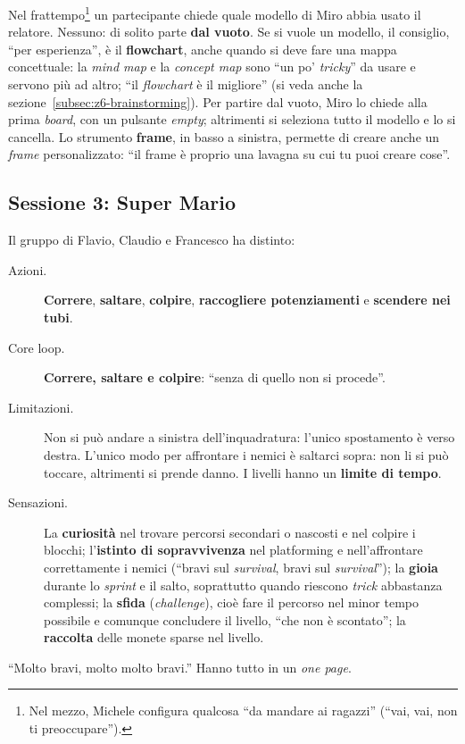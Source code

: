 Nel frattempo\footnote{Nel mezzo, Michele configura qualcosa ``da mandare ai
ragazzi'' (``vai, vai, non ti preoccupare'').} un partecipante chiede quale
modello di Miro abbia usato il relatore. Nessuno: di solito parte \textbf{dal
vuoto}. Se si vuole un modello, il consiglio, ``per esperienza'', è il
\textbf{flowchart}, anche quando si deve fare una mappa concettuale: la
\emph{mind map} e la \emph{concept map} sono ``un po' \emph{tricky}'' da usare e
servono più ad altro; ``il \emph{flowchart} è il migliore'' (si veda anche la
sezione~\ref{subsec:z6-brainstorming}). Per partire dal vuoto, Miro lo chiede
alla prima \emph{board}, con un pulsante \emph{empty}; altrimenti si seleziona
tutto il modello e lo si cancella. Lo strumento \textbf{frame}, in basso a
sinistra, permette di creare anche un \emph{frame} personalizzato: ``il frame è
proprio una lavagna su cui tu puoi creare cose''.

\subsection{Sessione 3: Super Mario}

Il gruppo di Flavio, Claudio e Francesco ha distinto:
\begin{description}
  \item[Azioni.] \textbf{Correre}, \textbf{saltare}, \textbf{colpire},
        \textbf{raccogliere potenziamenti} e \textbf{scendere nei tubi}.
  \item[Core loop.] \textbf{Correre, saltare e colpire}: ``senza di quello non
        si procede''.
  \item[Limitazioni.] Non si può andare a sinistra dell'inquadratura: l'unico
        spostamento è verso destra. L'unico modo per affrontare i nemici è
        saltarci sopra: non li si può toccare, altrimenti si prende danno. I
        livelli hanno un \textbf{limite di tempo}.
  \item[Sensazioni.] La \textbf{curiosità} nel trovare percorsi secondari o
        nascosti e nel colpire i blocchi; l'\textbf{istinto di sopravvivenza} nel
        platforming e nell'affrontare correttamente i nemici (``bravi sul
        \emph{survival}, bravi sul \emph{survival}''); la \textbf{gioia} durante
        lo \emph{sprint} e il salto, soprattutto quando riescono \emph{trick}
        abbastanza complessi; la \textbf{sfida} (\emph{challenge}), cioè fare il
        percorso nel minor tempo possibile e comunque concludere il livello,
        ``che non è scontato''; la \textbf{raccolta} delle monete sparse nel
        livello.
\end{description}
``Molto bravi, molto molto bravi.'' Hanno tutto in un \emph{one page}.

